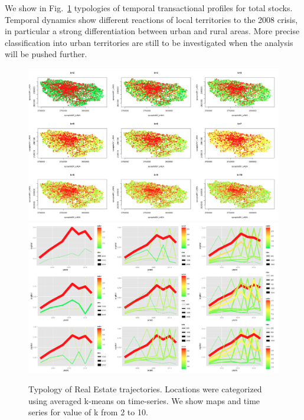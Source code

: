 
We show in Fig.~\ref{fig:realestate} typologies of temporal transactional profiles for total stocks. Temporal dynamics show different reactions of local territories to the 2008 crisis, in particular a strong differentiation between urban and rural areas. More precise classification into urban territories are still to be investigated when the analysis will be pushed further.



\begin{figure}
\hspace{-3cm}\includegraphics[width=1.4\textwidth]{Figures/RealEstate/normalized_k2-10}
\smallskip
\hspace{-3cm}\includegraphics[width=1.4\textwidth]{Figures/RealEstate/trajectories_normalized_k=2-10}
\caption[Typology of Real Estate trajectories]{Typology of Real Estate trajectories. Locations were categorized using averaged k-means on time-series. We show maps and time series for value of k from 2 to 10.}{}
\label{fig:realestate}
\end{figure}



